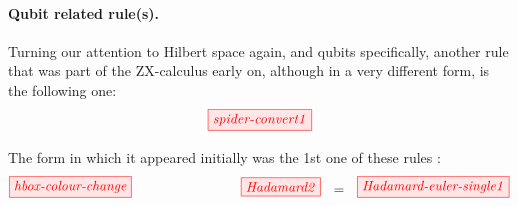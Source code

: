 \documentclass[11pt]{article}
\theoremstyle{definition}
\newcommand{\beq}{\begin{equation}}
\newcommand{\eeq}{\end{equation}\par\noindent}
\begin{document}

\paragraph{Qubit related rule(s).}  Turning our attention to Hilbert space again, and qubits specifically, another rule that was part of the ZX-calculus early on, although in a very different form,  is the following one:
\beq\label{spider-convert1}
\tikzfig{spider-convert1}   
\eeq
The form in which it appeared initially was the 1st one of these rules \cite{CD1}:     
\beq\label{hbox-colour-change}
\tikzfig{hbox-colour-change}   
\qquad\qquad\qquad\qquad
\tikzfig{Hadamard2}\ \ =\ \ \tikzfig{Hadamard-euler-single1}  
\eeq
\end{document}
